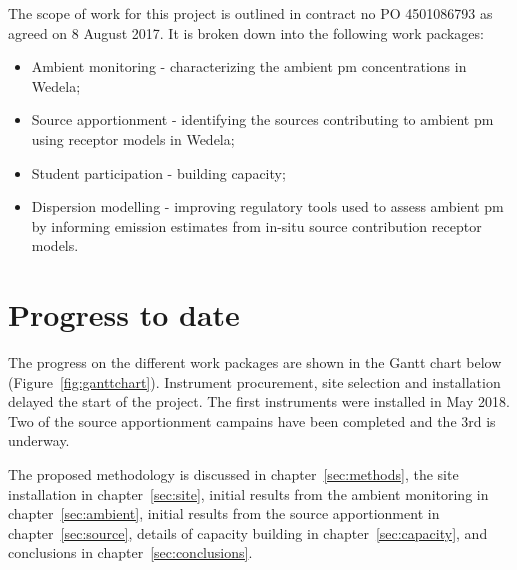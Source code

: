 \documentclass{nwureport}
\begin{document}
The scope of work for this project is outlined in contract no PO 4501086793 as agreed on 8 August 2017. It is broken down into the following work packages:
\begin{itemize}
\item Ambient monitoring - characterizing the ambient \gls{pm} concentrations in Wedela;
\item Source apportionment - identifying the sources contributing to ambient \gls{pm} using receptor models in Wedela;
\item Student participation - building capacity;
\item Dispersion modelling - improving regulatory tools used to assess ambient \gls{pm} by informing emission estimates from in-situ source contribution receptor models. 
\end{itemize}

\section{Progress to date}

The progress on the different work packages are shown in the Gantt chart below (Figure~\ref{fig:ganttchart}). Instrument procurement, site selection and installation delayed the start of the project. The first instruments were installed in May 2018. Two of the source apportionment campains have been completed and the 3rd is underway. 

The proposed methodology is discussed in chapter~\ref{sec:methods}, the site installation in chapter~\ref{sec:site}, initial results from the ambient monitoring in chapter~\ref{sec:ambient}, initial results from the source apportionment in chapter~\ref{sec:source}, details of capacity building in chapter~\ref{sec:capacity}, and conclusions in chapter~\ref{sec:conclusions}.
\end{document}

